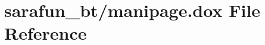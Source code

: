 \hypertarget{manipage_8dox}{\section{sarafun\-\_\-bt/manipage.dox File Reference}
\label{manipage_8dox}
}
